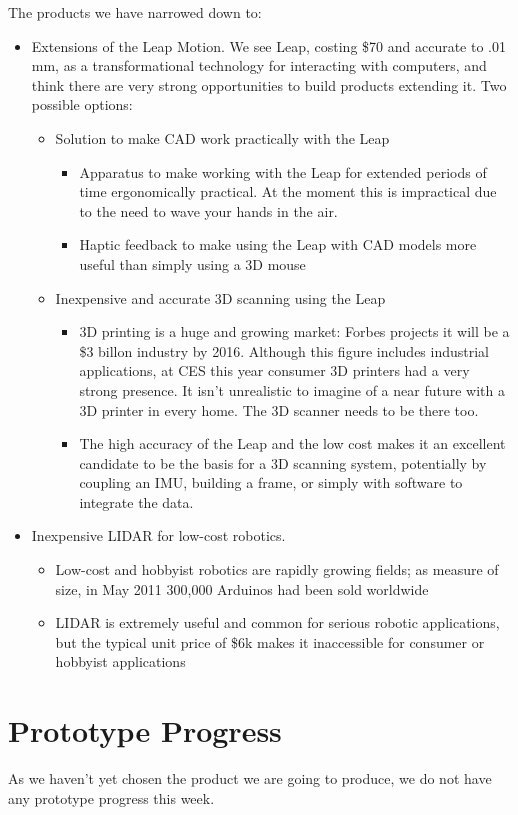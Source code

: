 \documentclass[10pt]{article}
\begin{document}
The products we have narrowed down to:
\begin{itemize}
\item Extensions of the Leap Motion. We see Leap, costing \$70 and accurate to .01
  mm, as a transformational technology for interacting with computers, and think
  there are very strong opportunities to build products extending it. Two
  possible options:
\begin{itemize}
\item Solution to make CAD work practically with the Leap
\begin{itemize}
\item Apparatus to make working with the Leap for extended periods of time
ergonomically practical. At the moment this is impractical due to the need to
wave your hands in the air.
\item Haptic feedback to make using the Leap with CAD models more useful than
  simply using a 3D mouse
\end{itemize}
\item Inexpensive and accurate 3D scanning using the Leap
\begin{itemize}
\item 3D printing is a huge and growing market: Forbes projects it will be a
  \$3 billon industry by 2016. Although this figure includes industrial applications,
  at CES this year consumer 3D printers had a very strong presence. It isn't unrealistic to
  imagine of a near future with a 3D printer in every home. The 3D scanner needs
  to be there too.
\item The high accuracy of the Leap and the low cost makes it an excellent candidate
  to be the basis for a 3D scanning system, potentially by coupling an
  IMU, building a frame, or simply with software to integrate the data.
\end{itemize}
\end{itemize}

\item Inexpensive LIDAR for low-cost robotics. 
\begin{itemize}
\item Low-cost and hobbyist robotics are rapidly growing fields; as measure of size,
  in May 2011 300,000 Arduinos had been sold worldwide
\item LIDAR is extremely useful and common for serious robotic applications, but
  the typical unit price of \$6k makes it inaccessible for consumer or hobbyist
  applications
\end{itemize}
\end{itemize}



\section{Prototype Progress}
As we haven't yet chosen the product we are going to produce, we do not have any
prototype progress this week. 
\end{document}
